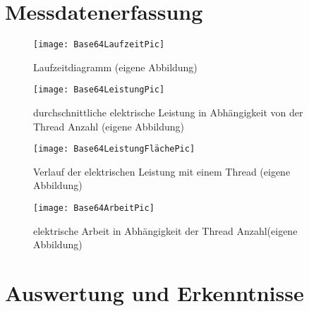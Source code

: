 \section{Messdatenerfassung}



\begin{figure}[H]
	\begin{center}	 
	\texttt{[image: Base64LaufzeitPic]}
	\caption{Laufzeitdiagramm (eigene Abbildung)}
	\label{fig:Base64LaufzeitPic} 
	\end{center}
\end{figure}



\begin{figure}[h]
	\begin{center}	 
	\texttt{[image: Base64LeistungPic]}
	\caption{durchschnittliche elektrische Leistung in Abhängigkeit von der Thread Anzahl (eigene Abbildung)}
	\label{fig:Base64LeistungPic} 
	\end{center}
\end{figure}



\begin{figure}[H]
	\begin{center}	 
	\texttt{[image: Base64LeistungFlächePic]}
	\caption{Verlauf der elektrischen Leistung mit einem Thread (eigene Abbildung)}
	\label{fig:Base64LeistungFlächePic} 
	\end{center}
\end{figure}

\begin{figure}[H]
	\begin{center}	 
	\texttt{[image: Base64ArbeitPic]}
	\caption{elektrische Arbeit in Abhängigkeit der Thread Anzahl(eigene Abbildung)}
	\label{fig:Base64ArbeitPic} 
	\end{center}
\end{figure}


\section{Auswertung und Erkenntnisse}